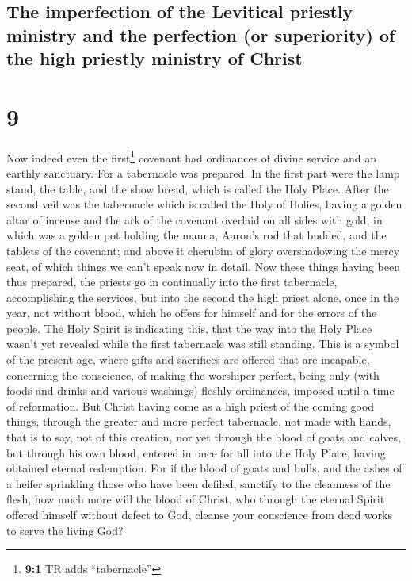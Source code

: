 \hypertarget{the-imperfection-of-the-levitical-priestly-ministry-and-the-perfection-or-superiority-of-the-high-priestly-ministry-of-christ}{%
\subsection{The imperfection of the Levitical priestly ministry and the
perfection (or superiority) of the high priestly ministry of
Christ}\label{the-imperfection-of-the-levitical-priestly-ministry-and-the-perfection-or-superiority-of-the-high-priestly-ministry-of-christ}}

\hypertarget{section-8}{%
\section{9}\label{section-8}}

 Now indeed even the first\footnote{\textbf{9:1} TR adds
  ``tabernacle''} covenant had ordinances of divine service and an
earthly sanctuary.  For a tabernacle was prepared. In the
first part were the lamp stand, the table, and the show bread, which is
called the Holy Place.  After the second veil was the
tabernacle which is called the Holy of Holies,  having a
golden altar of incense and the ark of the covenant overlaid on all
sides with gold, in which was a golden pot holding the manna, Aaron's
rod that budded, and the tablets of the covenant;  and
above it cherubim of glory overshadowing the mercy seat, of which things
we can't speak now in detail.  Now these things having
been thus prepared, the priests go in continually into the first
tabernacle, accomplishing the services,  but into the
second the high priest alone, once in the year, not without blood, which
he offers for himself and for the errors of the people. 
The Holy Spirit is indicating this, that the way into the Holy Place
wasn't yet revealed while the first tabernacle was still standing.
 This is a symbol of the present age, where gifts and
sacrifices are offered that are incapable, concerning the conscience, of
making the worshiper perfect,  being only (with foods and
drinks and various washings) fleshly ordinances, imposed until a time of
reformation.  But Christ having come as a high priest of
the coming good things, through the greater and more perfect tabernacle,
not made with hands, that is to say, not of this creation,
 nor yet through the blood of goats and calves, but
through his own blood, entered in once for all into the Holy Place,
having obtained eternal redemption.  For if the blood of
goats and bulls, and the ashes of a heifer sprinkling those who have
been defiled, sanctify to the cleanness of the flesh, 
how much more will the blood of Christ, who through the eternal Spirit
offered himself without defect to God, cleanse your conscience from dead
works to serve the living God?

